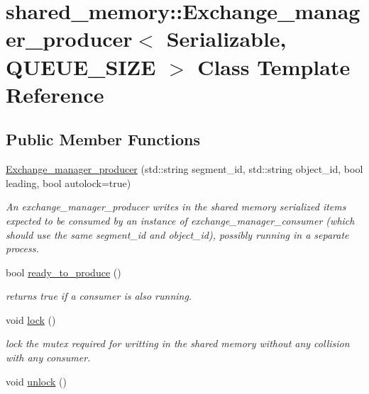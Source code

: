 \hypertarget{classshared__memory_1_1Exchange__manager__producer}{}\section{shared\+\_\+memory\+:\+:Exchange\+\_\+manager\+\_\+producer$<$ Serializable, Q\+U\+E\+U\+E\+\_\+\+S\+I\+ZE $>$ Class Template Reference}
\label{classshared__memory_1_1Exchange__manager__producer}
\subsection*{Public Member Functions}
\begin{DoxyCompactItemize}
\item 
\hyperlink{classshared__memory_1_1Exchange__manager__producer_a3fb01ae44f85b9d8b4a22137f2da90f1}{Exchange\+\_\+manager\+\_\+producer} (std\+::string segment\+\_\+id, std\+::string object\+\_\+id, bool leading, bool autolock=true)
\begin{DoxyCompactList}\small\item\em An exchange\+\_\+manager\+\_\+producer writes in the shared memory serialized items expected to be consumed by an instance of exchange\+\_\+manager\+\_\+consumer (which should use the same segment\+\_\+id and object\+\_\+id), possibly running in a separate process. \end{DoxyCompactList}\item 
bool \hyperlink{classshared__memory_1_1Exchange__manager__producer_a3ef5cfdd196a396edfd6ca502119f839}{ready\+\_\+to\+\_\+produce} ()
\begin{DoxyCompactList}\small\item\em returns true if a consumer is also running. \end{DoxyCompactList}\item 
void \hyperlink{classshared__memory_1_1Exchange__manager__producer_aa39c8b921eeff081111c756bd6d2ca3d}{lock} ()
\begin{DoxyCompactList}\small\item\em lock the mutex required for writting in the shared memory without any collision with any consumer. \end{DoxyCompactList}\item 
void \hyperlink{classshared__memory_1_1Exchange__manager__producer_a9c02040ee5ef8db658f3112ae4b3b969}{unlock} ()

\end{DoxyCompactItemize}
